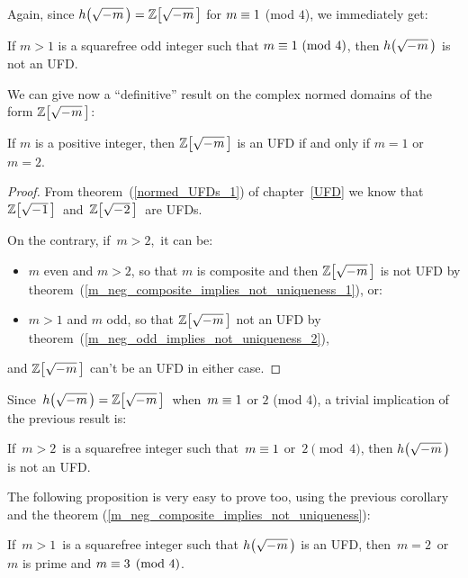 Again, since $\hhm{m} = \ZZM{m}$ for $m \equiv 1$ (mod $4$),
we immediately get:

\begin{cor}\label{m_neg_odd_implies_not_uniqueness_2}
If\/ $m > 1$\/ is a squarefree odd integer such that\/
$m \equiv 1\ (\mathrm{mod}\ 4)$, then $\hhm{m}$
is not an UFD.
\end{cor}

We can give now a ``definitive'' result on the complex
normed domains of the form $\ZZM{m}$:

\begin{thm}\label{definitive_result_on_uniqueness_in_Z[sqrt(-m)]}
If $m$ is a positive integer, then $\ZZM{m}$
is an UFD if and only if\/ $m = 1$ or $m = 2$.
\end{thm}

\begin{proof}
%
From theorem~(\ref{normed_UFDs_1}) of chapter~\ref{UFD} we know that
\,$\ZZM{1}$\, and\, $\ZZM{2}$\, are UFDs.

On the contrary, if\, $m > 2$,\, it can be:
\begin{itemize}
 \item $m$ even and $m > 2$, so that $m$ is composite and then
       $\ZZM{m}$ is not UFD by
       theorem~(\ref{m_neg_composite_implies_not_uniqueness_1}),\: or:
 \item $m > 1$ and $m$ odd, so that $\ZZM{m}$ not an UFD by
       theorem~(\ref{m_neg_odd_implies_not_uniqueness_2}),
\end{itemize}
and $\ZZM{m}$ can't be an UFD in either case.
\end{proof}

Since\, $\hhm{m} = \ZZM{m}$\, when\, $m \equiv 1$ or $2$ (mod $4$),
a trivial implication of the previous result is:

\begin{cor}
If \,$m > 2$\, is a squarefree integer such that \,$m \equiv 1$ or\,
$2 \pmod 4$, then $\hhm{m}$ is not an UFD.
\end{cor}

The following proposition is very easy to prove too,
using the previous corollary and the theorem
(\ref{m_neg_composite_implies_not_uniqueness}):

\begin{thm}\label{h(sqrt(-m))_UFD_constraint_m}
If\, $m > 1$\, is a squarefree integer such that $\hhm{m}$
is an UFD, then\, $m = 2$\, or \,$m$ is prime and
$m \equiv 3 \pmod 4$.
\end{thm}

